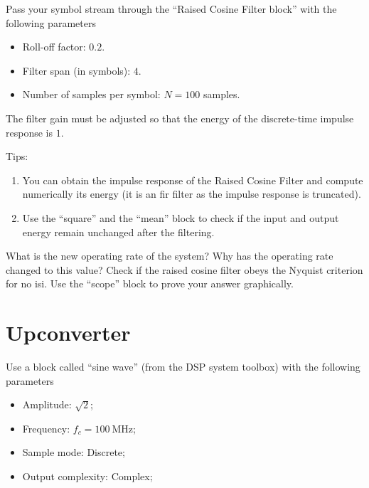 \documentclass[12pt,a4paper]{article}
\begin{document}
\problem Pass your symbol stream through the ``Raised Cosine Filter block'' with the following parameters
\begin{itemize}
    \item Roll-off factor: \(0.2\).
    \item Filter span (in symbols): \(4\).
    \item Number of samples per symbol: \(N=100\) samples.
\end{itemize}
The filter gain must be adjusted so that the energy of the discrete-time impulse response is \(1\).

Tips:
\begin{enumerate}
    \item You can obtain the impulse response of the Raised Cosine Filter and compute numerically its energy (it is an \gls{fir} filter as the impulse response is truncated).
    \item Use the ``square'' and the ``mean'' block to check if the input and output energy remain unchanged after the filtering.
\end{enumerate}
\subproblem What is the new operating rate of the system? Why has the operating rate changed to this value?
\subproblem Check if the raised cosine filter obeys the Nyquist criterion for no \gls{isi}. Use the ``scope'' block to prove your answer graphically.

\section{Upconverter}

\problem Use a block called ``sine wave'' (from the DSP system toolbox) with the following parameters
\begin{itemize}
    \item Amplitude: \(\sqrt{2}\);
    \item Frequency: \(f_c = \qty{100}{\mega\hertz}\);
    \item Sample mode: Discrete;
    \item Output complexity: Complex;
\end{itemize}
\end{document}
